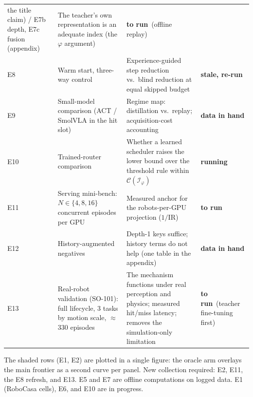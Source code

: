 \documentclass{article}
\newcommand{\RUNNING}{\colorbox{orange!25}{\scriptsize\textbf{running}}}
\newcommand{\TORUN}{\colorbox{red!15}{\scriptsize\textbf{to run}}}
\newcommand{\STALE}{\colorbox{gray!20}{\scriptsize\textbf{stale, re-run}}}
\newcommand{\INHAND}{\colorbox{green!18}{\scriptsize\textbf{data in hand}}}
\begin{document}
\begin{table}[h]
\begin{tabular}{@{}l p{4.6cm} p{4.2cm} l@{}}
     the title claim) / E7b depth, E7c fusion (appendix) & The teacher's own
     representation is an adequate index (the $\varphi$ argument) & \TORUN\ {\scriptsize(offline replay)} \\
\addlinespace
E8 & Warm start, three-way control & Experience-guided step reduction vs.\
     blind reduction at equal skipped budget & \STALE \\
\addlinespace
E9 & Small-model comparison (ACT / SmolVLA in the hit slot) & Regime map:
     distillation vs.\ replay; acquisition-cost accounting & \INHAND \\
\addlinespace
E10 & Trained-router comparison & Whether a learned scheduler raises the
     lower bound over the threshold rule within
     $\mathcal{C}(\mathcal{I}_\varphi)$ & \RUNNING \\
\addlinespace
E11 & Serving mini-bench: $N \in \{4,8,16\}$ concurrent episodes per GPU &
     Measured anchor for the robots-per-GPU projection ($1/\mathrm{IR}$) & \TORUN \\
\addlinespace
E12 & History-augmented negatives & Depth-1 keys suffice; history terms do not
     help (one table in the appendix) & \INHAND \\
\addlinespace
E13 & Real-robot validation (SO-101): full lifecycle, 3 tasks by motion scale,
     $\approx$330 episodes & The mechanism functions under real perception and
     physics; measured hit/miss latency; removes the simulation-only
     limitation & \TORUN\ {\scriptsize(teacher fine-tuning first)} \\
\bottomrule
\end{tabular}
\end{table}

\noindent
The shaded rows (E1, E2) are plotted in a single figure: the oracle arm
overlays the main frontier as a second curve per panel.
New collection required: E2, E11, the E8 refresh, and E13. E5 and E7 are offline
computations on logged data. E1 (RoboCasa cells), E6, and E10 are in progress.
\end{document}
